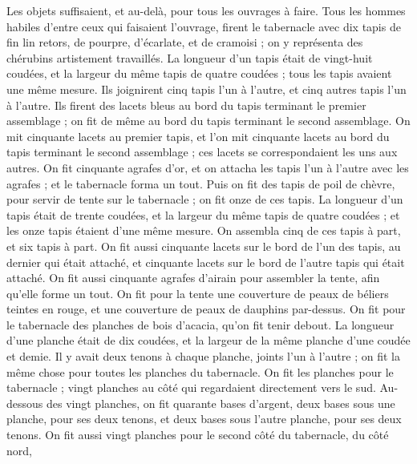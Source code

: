 \begin{multicols}{2}
Les objets suffisaient, et au-delà, pour tous les ouvrages à faire.
Tous les hommes habiles d'entre ceux qui faisaient l'ouvrage, firent le tabernacle avec dix tapis de fin lin retors, de pourpre, d'écarlate, et de cramoisi ; on y représenta des chérubins artistement travaillés.
La longueur d'un tapis était de vingt-huit coudées, et la largeur du même tapis de quatre coudées ; tous les tapis avaient une même mesure.
Ils joignirent cinq tapis l'un à l'autre, et cinq autres tapis l'un à l'autre.
Ils firent des lacets bleus au bord du tapis terminant le premier assemblage ; on fit de même au bord du tapis terminant le second assemblage.
On mit cinquante lacets au premier tapis, et l’on mit cinquante lacets au bord du tapis terminant le second assemblage ; ces lacets se correspondaient les uns aux autres.
On fit cinquante agrafes d'or, et on attacha les tapis l'un à l'autre avec les agrafes ; et le tabernacle forma un tout.
Puis on fit des tapis de poil de chèvre, pour servir de tente sur le tabernacle ; on fit onze de ces tapis.
La longueur d'un tapis était de trente coudées, et la largeur du même tapis de quatre coudées ; et les onze tapis étaient d'une même mesure.
On assembla cinq de ces tapis à part, et six tapis à part.
On fit aussi cinquante lacets sur le bord de l'un des tapis, au dernier qui était attaché, et cinquante lacets sur le bord de l'autre tapis qui était attaché.
On fit aussi cinquante agrafes d'airain pour assembler la tente, afin qu’elle forme un tout.
On fit pour la tente une couverture de peaux de béliers teintes en rouge, et une couverture de peaux de dauphins par-dessus.
On fit pour le tabernacle des planches de bois d’acacia, qu'on fit tenir debout.
La longueur d’une planche était de dix coudées, et la largeur de la même planche d'une coudée et demie.
Il y avait deux tenons à chaque planche, joints l'un à l'autre ; on fit la même chose pour toutes les planches du tabernacle.
On fit les planches pour le tabernacle ; vingt planches au côté qui regardaient directement vers le sud.
Au-dessous des vingt planches, on fit quarante bases d'argent, deux bases sous une planche, pour ses deux tenons, et deux bases sous l'autre planche, pour ses deux tenons.
On fit aussi vingt planches pour le second côté du tabernacle, du côté nord,

\end{multicols}
